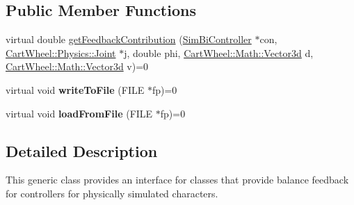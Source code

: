 \subsection*{Public Member Functions}
\begin{DoxyCompactItemize}
\item 
virtual double \hyperlink{classCartWheel_1_1Core_1_1BalanceFeedback_aa76a657676cd048cecfcd7963beb35cb}{getFeedbackContribution} (\hyperlink{classCartWheel_1_1Core_1_1SimBiController}{SimBiController} $\ast$con, \hyperlink{classCartWheel_1_1Physics_1_1Joint}{CartWheel::Physics::Joint} $\ast$j, double phi, \hyperlink{classCartWheel_1_1Math_1_1Vector3d}{CartWheel::Math::Vector3d} d, \hyperlink{classCartWheel_1_1Math_1_1Vector3d}{CartWheel::Math::Vector3d} v)=0
\item 
\hypertarget{classCartWheel_1_1Core_1_1BalanceFeedback_ab4ef8f6172f382f42c74b01e80fa3179}{
virtual void {\bfseries writeToFile} (FILE $\ast$fp)=0}
\label{classCartWheel_1_1Core_1_1BalanceFeedback_ab4ef8f6172f382f42c74b01e80fa3179}

\item 
\hypertarget{classCartWheel_1_1Core_1_1BalanceFeedback_ad928e5b532ce71accb6b6a44d8861f7f}{
virtual void {\bfseries loadFromFile} (FILE $\ast$fp)=0}
\label{classCartWheel_1_1Core_1_1BalanceFeedback_ad928e5b532ce71accb6b6a44d8861f7f}

\end{DoxyCompactItemize}


\subsection{Detailed Description}
This generic class provides an interface for classes that provide balance feedback for controllers for physically simulated characters. 

